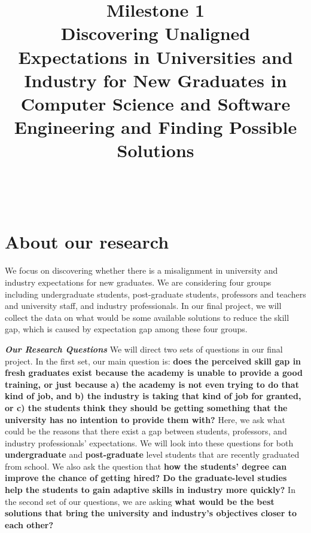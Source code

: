 \documentclass{sigchi}
\begin{document}
\title{Milestone 1\\ Discovering Unaligned Expectations in Universities and Industry for New Graduates in Computer Science and Software Engineering and Finding Possible Solutions}

\author{%
  \\
  \\
}

\maketitle

\section{About our research}
We focus on discovering whether there is a misalignment in university and industry expectations for new graduates. We are considering four groups including undergraduate students, post-graduate students, professors and teachers and university staff, and industry professionals. In our final project, we will collect the data on what would be some available solutions to reduce the skill gap, which is caused by expectation gap among these four groups.

\textit{\textbf{Our Research Questions}}\newline
We will direct two sets of questions in our final project. In the first set, our main question is: \textbf{does the perceived skill gap in fresh graduates exist because the academy is unable to provide a good training, or just because a) the academy is not even trying to do that kind of job, and b) the industry is taking that kind of job for granted, or c) the students think they should be getting something that the university has no intention to provide them with?} Here, we ask what could be the reasons that there exist a gap between students, professors, and industry professionals' expectations. We will look into these questions for both \textbf{undergraduate} and \textbf{post-graduate} level students that are recently graduated from school. We also ask the question that \textbf{how the students' degree can improve the chance of getting hired? Do the graduate-level studies help the students to gain adaptive skills in industry more quickly?}\newline
In the second set of our questions, we are asking \textbf{what would be the best solutions that bring the university and industry's objectives closer to each other?} 
\end{document}
